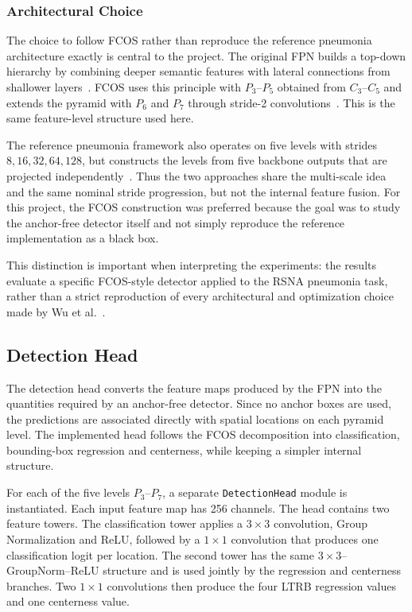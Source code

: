 \documentclass[11pt,a4paper]{article}
\begin{document}
\subsubsection{Architectural Choice}
\label{subsubsec:architectural_choice}

The choice to follow FCOS rather than reproduce the reference pneumonia
architecture exactly is central to the project. The original FPN builds a
top-down hierarchy by combining deeper semantic features with lateral
connections from shallower layers~\cite{lin2017fpn}. FCOS uses this principle
with $P_3$--$P_5$ obtained from $C_3$--$C_5$ and extends the pyramid with
$P_6$ and $P_7$ through stride-2 convolutions~\cite{tian2019fcos}. This is the
same feature-level structure used here.

The reference pneumonia framework also operates on five levels with strides
$8,16,32,64,128$, but constructs the levels from five backbone outputs that
are projected independently~\cite{wu2024pneumonia}. Thus the two approaches
share the multi-scale idea and the same nominal stride progression, but not
the internal feature fusion. For this project, the FCOS construction was
preferred because the goal was to study the anchor-free detector itself and
not simply reproduce the reference implementation as a black box.

This distinction is important when interpreting the experiments: the results
evaluate a specific FCOS-style detector applied to the RSNA pneumonia task,
rather than a strict reproduction of every architectural and optimization
choice made by Wu et al.~\cite{wu2024pneumonia}.

\subsection{Detection Head}
\label{subsec:detection_head}

The detection head converts the feature maps produced by the FPN into the
quantities required by an anchor-free detector. Since no anchor boxes are
used, the predictions are associated directly with spatial locations on each
pyramid level. The implemented head follows the FCOS decomposition into
classification, bounding-box regression and centerness, while keeping a
simpler internal structure.

For each of the five levels $P_3$--$P_7$, a separate \texttt{DetectionHead}
module is instantiated. Each input feature map has 256 channels. The head
contains two feature towers. The classification tower applies a $3\times3$
convolution, Group Normalization and ReLU, followed by a $1\times1$
convolution that produces one classification logit per location. The second
tower has the same $3\times3$--GroupNorm--ReLU structure and is used jointly
by the regression and centerness branches. Two $1\times1$ convolutions then
produce the four LTRB regression values and one centerness value.
\end{document}
